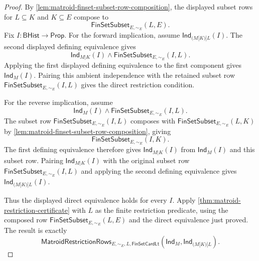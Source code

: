\begin{proof}
By \autoref{lem:matroid-finset-subset-row-composition}, the displayed subset rows for $L\subseteq K$ and $K\subseteq E$ compose to
$$
\mathsf{FinSetSubset}_{E,\sim_E}(L,E).
$$
Fix $I:\mathsf{BHist}\to\mathsf{Prop}$. For the forward implication, assume $\mathsf{Ind}_{(M|K)|L}(I)$. The second displayed defining equivalence gives
$$
\mathsf{Ind}_{M|K}(I)\land\mathsf{FinSetSubset}_{E,\sim_E}(I,L).
$$
Applying the first displayed defining equivalence to the first component gives $\mathsf{Ind}_M(I)$. Pairing this ambient independence with the retained subset row $\mathsf{FinSetSubset}_{E,\sim_E}(I,L)$ gives the direct restriction condition.

For the reverse implication, assume
$$
\mathsf{Ind}_M(I)\land\mathsf{FinSetSubset}_{E,\sim_E}(I,L).
$$
The subset row $\mathsf{FinSetSubset}_{E,\sim_E}(I,L)$ composes with $\mathsf{FinSetSubset}_{E,\sim_E}(L,K)$ by \autoref{lem:matroid-finset-subset-row-composition}, giving
$$
\mathsf{FinSetSubset}_{E,\sim_E}(I,K).
$$
The first defining equivalence therefore gives $\mathsf{Ind}_{M|K}(I)$ from $\mathsf{Ind}_M(I)$ and this subset row. Pairing $\mathsf{Ind}_{M|K}(I)$ with the original subset row $\mathsf{FinSetSubset}_{E,\sim_E}(I,L)$ and applying the second defining equivalence gives $\mathsf{Ind}_{(M|K)|L}(I)$.

Thus the displayed direct equivalence holds for every $I$. Apply \autoref{thm:matroid-restriction-certificate} with $L$ as the finite restriction predicate, using the composed row $\mathsf{FinSetSubset}_{E,\sim_E}(L,E)$ and the direct equivalence just proved. The result is exactly
$$
\mathsf{MatroidRestrictionRows}_{E,\sim_E,L,\mathsf{FinSetCardLt}}
(\mathsf{Ind}_M,\mathsf{Ind}_{(M|K)|L}).
$$
\end{proof}

